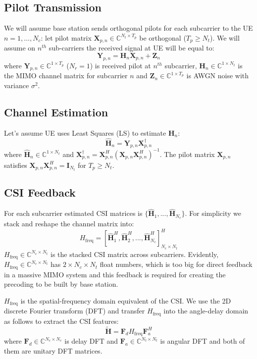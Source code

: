 \documentclass[lettersize,journal]{IEEEtran}
\begin{document}
\subsection{Pilot Transmission}
We will assume base station sends orthogonal pilots for each subcarrier to the UE $n=1,...,N_{c}$: let pilot matrix $\mathbf{X}_{p,n}\in \mathbb{C}^{N_{t}\times T_{p}}$ be orthogonal ($T_{p} \geq N_{t}$). We will assume on $n^{th}$ sub-carriers the received signal at UE will be equal to: 
\[
\mathbf{Y}_{p,n}=\mathbf{H}_{n}\mathbf{X}_{p,n}+\mathbf{Z}_{n} 
\]
where $\mathbf{Y}_{p,n} \in \mathbb{C}^{1\times T_{p}}$ ($N_{r}=1$) is received pilot at $n^{th}$ subcarrier, $\mathbf{H}_{n} \in \mathbb{C}^{1\times N_{t}}$ is the MIMO channel matrix for subcarrier $n$ and $\mathbf{Z}_{n}\in \mathbb{C}^{1\times T_{p}}$ is AWGN noise with variance $\sigma^{2}$.

\subsection{Channel Estimation}
Let's assume UE uses Least Squares (LS) to estimate $\mathbf{H}_{n}$:
\[
\hat{\mathbf{H}}_{n}=\mathbf{Y}_{p,n}\mathbf{X}^{\dag}_{p,n}
\]
where $\hat{\mathbf{H}}_{n} \in \mathbb{C}^{1\times N_{t}}$ and $\mathbf{X}_{p,n}^{\dag}= \mathbf{X}^{H}_{p,n}(\mathbf{X}_{p,n}\mathbf{X}^{H}_{p,n})^{-1}$. The pilot matrix $\mathbf{X}_{p,n}$ satisfies $\mathbf{X}_{p,n} \mathbf{X}_{p,n}^H = \mathbf{I}_{N_t}$ for $T_p \geq N_t$.

\subsection{CSI Feedback}
For each subcarrier estimated CSI matrices is $\{ \hat{\mathbf{H}}_{1},...,\hat{\mathbf{H}}_{N_{c}} \}$. For simplicity we stack and reshape the channel matrix into:
\[
H_{\text{freq}}=\left[\hat{\mathbf{H}}_{1}^{H},\hat{\mathbf{H}}_{2}^{H},...,\hat{\mathbf{H}}_{N_{c}}^{H}\right]^{H}_{N_{c}\times N_{t}}
\]
$H_{\text{freq}} \in \mathbb{C}^{N_c \times N_t}$ is the stacked CSI matrix across subcarriers. Evidently, $H_{\text{freq}} \in \mathbb{C}^{N_{c}\times N_{t}}$ has $2\times N_{c}\times N_{t}$ float numbers, which is too big for direct feedback in a massive MIMO system and this feedback is required for creating the precoding to be built by base station.

$H_{\text{freq}}$ is the spatial-frequency domain equivalent of the CSI. We use the 2D discrete Fourier transform (DFT) and transfer $H_{\text{freq}}$ into the angle-delay domain as follows to extract the CSI features:
\[
\tilde{\mathbf{H}} = \mathbf{F}_d H_{\text{freq}} \mathbf{F}_a^H
\]
where $\mathbf{F}_d \in \mathbb{C}^{N_{c}\times N_{c}}$ is delay DFT and $\mathbf{F}_a \in \mathbb{C}^{N_{t}\times N_{t}}$ is angular DFT and both of them are unitary DFT matrices.
\end{document}
